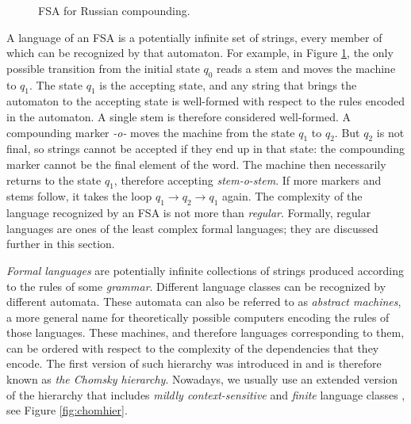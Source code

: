 \begin{figure}[h!]
\centering
{}
\caption{FSA for Russian compounding.}
\label{fig:ruscompounding}
\end{figure}


A language of an FSA is a potentially infinite set of strings, every member of which can be recognized by that automaton.
For example, in Figure \ref{fig:ruscompounding}, the only possible transition from the initial state $q_0$ reads a stem and moves the machine to $q_1$.
The state $q_1$ is the accepting state, and any string that brings the automaton to the accepting state is well-formed with respect to the rules encoded in the automaton.
A single stem is therefore considered well-formed.
A compounding marker \emph{-o-} moves the machine from the state $q_1$ to $q_2$.
But $q_2$ is not final, so strings cannot be accepted if they end up in that state: the compounding marker cannot be the final element of the word.
The machine then necessarily returns to the state $q_1$, therefore accepting \emph{stem-o-stem}.
If more markers and stems follow, it takes the loop $q_1\rightarrow q_2\rightarrow q_1$ again.
The complexity of the language recognized by an FSA is not more than \emph{regular}.
Formally, regular languages are ones of the least complex formal languages; they are discussed further in this section.


\emph{Formal languages} are potentially infinite collections of strings produced according to the rules of some \emph{grammar}.
Different language classes can be recognized by different automata.
These automata can also be referred to as \emph{abstract machines}, a more general name for theoretically possible computers encoding the rules of those languages.
These machines, and therefore languages corresponding to them, can be ordered with respect to the complexity of the dependencies that they encode.
The first version of such hierarchy was introduced in \cite{Chomsky1956} and is therefore known as \emph{the Chomsky hierarchy}.
Nowadays, we usually use an extended version of the hierarchy that includes \emph{mildly context-sensitive} and \emph{finite} language classes \citep{JagerRogers12}, see Figure \ref{fig:chomhier}.



